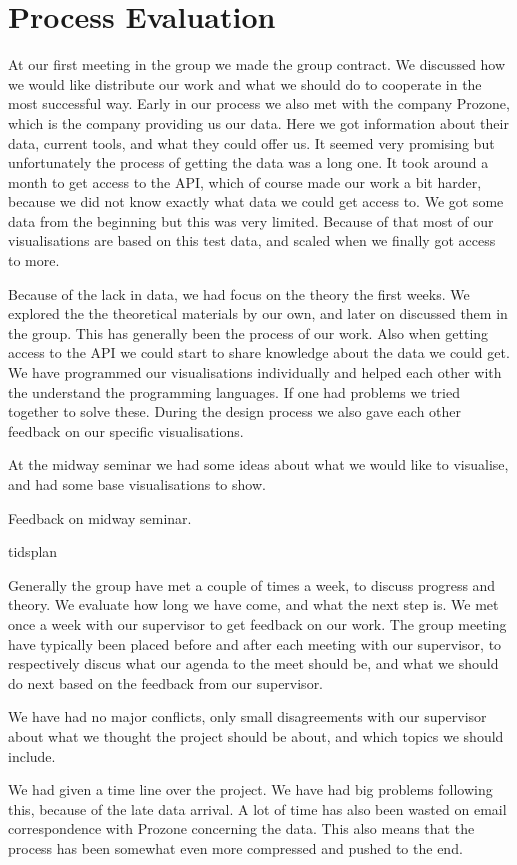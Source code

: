 \documentclass[Report.tex]{subfiles}
\begin{document}
\section{Process Evaluation}
At our first meeting in the group we made the group contract. We discussed how we would like distribute our work and what we should do to cooperate in the most successful way. Early in our process we also met with the company Prozone, which is the company providing us our data. Here we got information about their data, current tools, and what they could offer us. It seemed very promising but unfortunately the process of getting the data was a long one. It took around a month to get access to the API, which of course made our work a bit harder, because we did not know exactly what data we could get access to. We got some data from the beginning but this was very limited. Because of that most of our visualisations are based on this test data, and scaled when we finally got access to more.

Because of the lack in data, we had focus on the theory the first weeks. We explored the the theoretical materials by our own, and later on discussed them in the group. This has generally been the process of our work. Also when getting access to the API we could start to share knowledge about the data we could get. We have programmed our visualisations individually and helped each other with the understand the programming languages. If one had problems we tried together to solve these. During the design process we also gave each other feedback on our specific visualisations. 

At the midway seminar we had some ideas about what we would like to visualise, and had some base visualisations to show. 

Feedback on midway seminar. 

tidsplan 

Generally the group have met a couple of times a week, to discuss progress and theory. We evaluate how long we have come, and what the next step is. We met once a week with our supervisor to get feedback on our work. The group meeting have typically been placed before and after each meeting with our supervisor, to respectively discus what our agenda to the meet should be, and what we should do next based on the feedback from our supervisor.

We have had no major conflicts, only small disagreements with our supervisor about what we thought the project should be about, and which topics we should include.

We had given a time line over the project. We have had big problems following this, because of the late data arrival. A lot of time has also been wasted on email correspondence with Prozone concerning the data. This also means that the process has been somewhat even more compressed and pushed to the end. 
\end{document}
